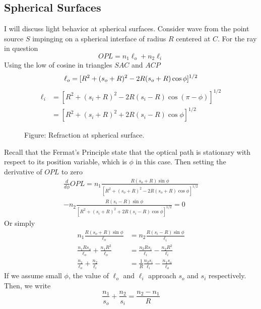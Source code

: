 \documentclass[../../../main.tex]{subfiles}
\begin{document}
\subsection*{Spherical Surfaces}
I will discuss light behavior at spherical surfaces. Consider wave from the point source $S$ impinging on a spherical interface of radius $R$ centered at $C$. For the ray in question
\begin{equation*}
    OPL=n_1\ell_o+n_2\ell_i
\end{equation*}
Using the low of cosine in triangles $SAC$ and $ACP$
\begin{equation*}
    \ell_o=[R^2+(s_o+R)^2-2R(s_o+R)\cos \phi]^{1/2}\\
\end{equation*}
\begin{align*}
    \ell_i&=[R^2+(s_i+R)^2-2R(s_i-R)\cos (\pi-\phi)]^{1/2}\\
    &=[R^2+(s_i+R)^2+2R(s_i-R)\cos \phi]^{1/2}
\end{align*}

\begin{figure}[b]
    \centering
    \caption*{Figure: Refraction at spherical surface.}
\end{figure}

Recall that the Fermat’s Principle state that the optical path is stationary with respect to its position variable, which is $\phi$ in this case. Then setting the derivative of $OPL$ to zero 
\begin{multline*}
    \frac{d}{d\phi}OPL=n_1\frac{R(s_o+R)\sin \phi}{[R^2+(s_o+R)^2-2R(s_o+R)\cos \phi]^{1/2}}\\
    - n_2\frac{R(s_i-R)\sin \phi}{[R^2+(s_i+R)^2+2R(s_i-R)\cos \phi]^{1/2}}=0
\end{multline*}
Or simply
\begin{align*}
    n_1\frac{R(s_o+R)\sin \phi}{\ell_o}&=n_2\frac{R(s_i-R)\sin \phi}{\ell_i}\\
    \frac{n_1Rs_o}{\ell_o}+\frac{n_1R^2}{\ell_o}&=\frac{n_2Rs_i}{\ell_i}-\frac{n_2R^2}{\ell_i}\\
    \frac{n_1}{\ell_o}+\frac{n_2}{\ell_i}&=\frac{1}{R}\frac{n_2s_i}{\ell_i}-\frac{n_1s_o}{\ell_o}
\end{align*}
If we assume small $\phi$, the value of $\ell_o$ and $\ell_i$ approach $s_o$ and $s_i$ respectively. Then, we write
\begin{equation*}
    \frac{n_1}{s_o}+\frac{n_2}{s_i}=\frac{n_2-n_1}{R}
\end{equation*}
\end{document}
